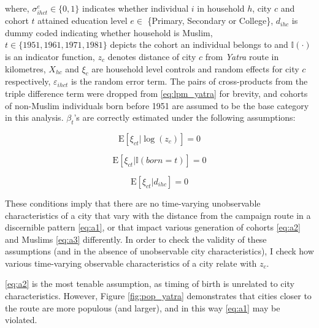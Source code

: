 \documentclass{article}
\newcommand{\E}{\mathrm{E}}
\begin{document}
where, $\sigma_{ihct}^e \in \{0, 1\}$ indicates whether individual $i$ in household $h$, city $c$ and cohort $t$ attained education level $e \in$ \{Primary, Secondary or College\}, $d_{ihc}$ is dummy coded indicating whether household is Muslim, $t \in \{1951, 1961, 1971, 1981 \}$ depicts the cohort an individual belongs to and $\mathbb{I(\cdot)}$ is an indicator function, $z_c$ denotes distance of city $c$ from \textit{Yatra} route in kilometres, $X_{hc}$ and $\xi_{c}$ are household level controls and random effects for city $c$ respectively, $\varepsilon_{ihct}$ is the random error term. The pairs of cross-products from the triple difference term were dropped from \eqref{eq:lpm_yatra} for brevity, and cohorts of non-Muslim individuals born before 1951 are assumed to be the base category in this analysis. $\beta_t$'s are correctly estimated under the following assumptions: 

\begin{equation} \label{eq:a1} \tag{A1}
    \E[\xi_{ct} | \log(z_c)] = 0
\end{equation}

\begin{equation} \label{eq:a2} \tag{A2}
    \E[\xi_{ct} | \mathbb{I} (born = t)] = 0
\end{equation}

\begin{equation} \label{eq:a3} \tag{A3}
    \E[\xi_{ct} | d_{ihc}] = 0
\end{equation} 

These conditions imply that there are no time-varying unobservable characteristics of a city that vary with the distance from the campaign route in a discernible pattern \eqref{eq:a1}, or that impact various generation of cohorts \eqref{eq:a2} and Muslims \eqref{eq:a3} differently. In order to check the validity of these assumptions (and in the absence of unobservable city characteristics), I check how various time-varying observable characteristics of a city relate with $z_c$.

\eqref{eq:a2} is the most tenable assumption, as timing of birth is unrelated to city characteristics. However, Figure \ref{fig:pop_yatra} demonstrates that cities closer to the route are more populous (and larger), and in this way \eqref{eq:a1} may be violated. 
\end{document}
